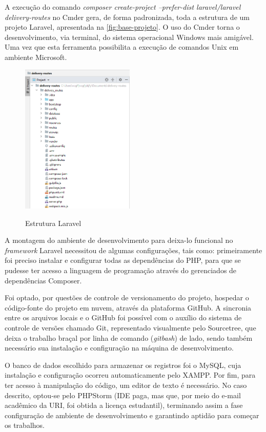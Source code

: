A execução do comando \textit{composer create-project --prefer-dist laravel/laravel delivery-routes} no Cmder gera, de forma padronizada, toda a estrutura de um projeto Laravel, apresentada na \autoref{fig:base-projeto}. O uso do Cmder torna o desenvolvimento, via terminal, do sistema operacional Windows mais amigável. Uma vez que esta ferramenta possibilita a execução de comandos Unix em ambiente Microsoft.

\begin{figure}[H]
    \centering
    \caption{Estrutura Laravel}
    \includegraphics[width=0.48\textwidth]{./dados/figuras/fig6}
    \label{fig:base-projeto}
\end{figure}

A montagem do ambiente de desenvolvimento para deixa-lo funcional no \textit{framework} Laravel necessitou de algumas configurações, tais como: primeiramente foi preciso instalar e configurar todas as dependências do PHP, para que se pudesse ter acesso a linguagem de programação através do gerenciados de dependências Composer.

Foi optado, por questões de controle de versionamento do projeto, hospedar o código-fonte do projeto em nuvem, através da plataforma GitHub. A sincronia entre os arquivos locais e o GitHub foi possível com o auxílio do sistema de controle de versões chamado Git, representado visualmente pelo Sourcetree, que deixa o trabalho braçal por linha de comando (\textit{gitbash}) de lado, sendo também necessário sua instalação e configuração na máquina de desenvolvimento. 

O banco de dados escolhido para armazenar os registros foi o MySQL, cuja instalação e configuração ocorreu automaticamente pelo XAMPP. Por fim, para ter acesso à manipulação do código, um editor de texto é necessário. No caso descrito, optou-se pelo PHPStorm (IDE paga, mas que, por meio do e-mail acadêmico da URI, foi obtida a licença estudantil), terminando assim a fase configuração de ambiente de desenvolvimento e garantindo aptidão para começar os trabalhos.

